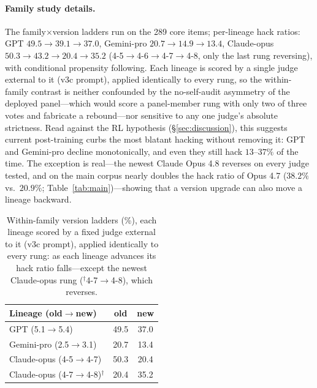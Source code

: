 \paragraph{Family study details.}
The family$\times$version ladders run on the 289 core items; per-lineage hack ratios: GPT $49.5\!\rightarrow\!39.1\!\rightarrow\!37.0$, Gemini-pro $20.7\!\rightarrow\!14.9\!\rightarrow\!13.4$, Claude-opus $50.3\!\rightarrow\!43.2\!\rightarrow\!20.4\!\rightarrow\!35.2$ (4-5$\rightarrow$4-6$\rightarrow$4-7$\rightarrow$4-8, only the last rung reversing), with conditional propensity following. Each lineage is scored by a single judge external to it (v3c prompt), applied identically to every rung, so the within-family contrast is neither confounded by the no-self-audit asymmetry of the deployed panel---which would score a panel-member rung with only two of three votes and fabricate a rebound---nor sensitive to any one judge's absolute strictness. Read against the RL hypothesis (\S\ref{sec:discussion}), this suggests current post-training curbs the most blatant hacking without removing it: GPT and Gemini-pro decline monotonically, and even they still hack $13$--$37\%$ of the time. The exception is real---the newest Claude Opus 4.8 reverses on every judge tested, and on the main corpus nearly doubles the hack ratio of Opus 4.7 ($38.2\%$ vs.\ $20.9\%$; Table~\ref{tab:main})---showing that a version upgrade can also move a lineage backward.

\begin{table}[!htbp]
\centering\small
\begin{tabular}{l cc}
\toprule
Lineage (old$\rightarrow$new) & \hr{} old & \hr{} new \\
\midrule
GPT (5.1$\rightarrow$5.4)          & 49.5 & 37.0 \\
Gemini-pro (2.5$\rightarrow$3.1)   & 20.7 & 13.4 \\
Claude-opus (4-5$\rightarrow$4-7)  & 50.3 & 20.4 \\
Claude-opus (4-7$\rightarrow$4-8)$^{\dagger}$  & 20.4 & 35.2 \\
\bottomrule
\end{tabular}
\caption{Within-family version ladders (\%), each lineage scored by a fixed judge external to it (v3c prompt), applied identically to every rung: as each lineage advances its hack ratio falls---except the newest Claude-opus rung ($^{\dagger}$4-7$\rightarrow$4-8), which reverses.}
\label{tab:ladder}
\end{table}
\FloatBarrier

